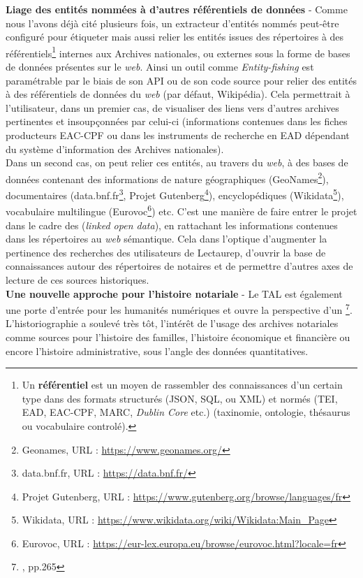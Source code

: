 \newpage
\textbf{Liage des entités nommées à d'autres référentiels de données} - Comme nous l'avons déjà cité plusieurs fois, un extracteur d'entités nommés peut-être configuré pour étiqueter mais aussi relier les entités issues des répertoires à des référentiels\footnote{Un \textbf{référentiel} est un moyen de rassembler des connaissances d'un certain type dans des formats structurés (JSON, SQL, ou XML) et normés (TEI, EAD, EAC-CPF, MARC, \textit{Dublin Core} etc.) (taxinomie, ontologie, thésaurus ou vocabulaire controlé).} internes aux Archives nationales, ou externes sous la forme de bases de données présentes sur le \textit{web}. Ainsi un outil comme \textit{Entity-fishing} est paramétrable par le biais de son API ou de son code source pour relier des entités à des référentiels de données du \textit{web} (par défaut, Wikipédia). Cela permettrait à l'utilisateur, dans un premier cas, de visualiser des liens vers d'autres archives pertinentes et insoupçonnées par celui-ci (informations contenues dans les fiches producteurs EAC-CPF ou dans les instruments de recherche en EAD dépendant du système d'information des Archives nationales).\\ 

Dans un second cas, on peut relier ces entités, au travers du \textit{web}, à des bases de données contenant des informations de nature géographiques (GeoNames\footnote{Geonames, URL : \url{https://www.geonames.org/}}), documentaires (data.bnf.fr\footnote{data.bnf.fr, URL : \url{https://data.bnf.fr/}}, Projet Gutenberg\footnote{Projet Gutenberg, URL : \url{https://www.gutenberg.org/browse/languages/fr}}), encyclopédiques (Wikidata\footnote{Wikidata, URL : \url{https://www.wikidata.org/wiki/Wikidata:Main_Page}}), vocabulaire multilingue (Eurovoc\footnote{Eurovoc, URL : \url{https://eur-lex.europa.eu/browse/eurovoc.html?locale=fr}}) etc. C'est une manière de faire entrer le projet dans le cadre des  (\textit{linked open data}), en rattachant les informations contenues dans les répertoires au \textit{web} sémantique. Cela dans l'optique d'augmenter la pertinence des recherches des utilisateurs de Lectaurep, d'ouvrir la base de connaissances autour des répertoires de notaires et de permettre d'autres axes de lecture de ces sources historiques.\\

\textbf{Une nouvelle approche pour l'histoire notariale} - Le TAL est également une porte d'entrée pour les humanités numériques et ouvre la perspective d'un \footnote{\cite{limon-bonnet_innovation_2019}, pp.265}. L'historiographie a soulevé très tôt, l'intérêt de l'usage des archives notariales comme sources pour l'histoire des familles, l'histoire économique et financière ou encore l'histoire administrative, sous l'angle des données quantitatives.%
\\

